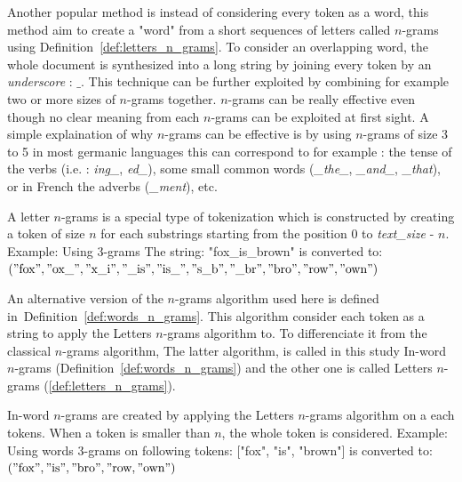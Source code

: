 Another popular method is instead of considering every token as a word, this method aim to create a "word" from a short sequences of letters called $n$-grams using Definition~\ref{def:letters_n_grams}.
To consider an overlapping word, the whole document is synthesized into a long string by joining every token by an \textit{underscore} : $\_$.
This technique can be further exploited by combining for example two or more sizes of $n$-grams together.
$n$-grams can be really effective even though no clear meaning from each $n$-grams can be exploited at first sight.
A simple explaination of why $n$-grams can be effective is by using $n$-grams of size 3 to 5 in most germanic languages this can correspond to for example : the tense of the verbs (i.e. : \textit{ing\_}, \textit{ed\_}), some small common words (\textit{\_the\_}, \textit{\_and\_}, \textit{\_that}), or in French the adverbs (\textit{\_ment}), etc.

\begin{definition}
  \label{def:letters_n_grams}
  A letter $n$-grams is a special type of tokenization which is constructed by creating a token of size $n$ for each substrings starting from the position $0$ to \textit{text\_size} - $n$.
  Example: Using 3-grams The string: "fox\_is\_brown" is converted to: \\
  $("\text{fox}", "\text{ox\_}", "\text{x\_i}", "\text{\_is}", "\text{is\_}", "\text{s\_b}", "\text{\_br}", "\text{bro}", "\text{row}", "\text{own}")$
\end{definition}

An alternative version of the $n$-grams algorithm used here is defined in~Definition~\ref{def:words_n_grams}.
This algorithm consider each token as a string to apply the Letters $n$-grams algorithm to.
To differenciate it from the classical $n$-grams algorithm,
The latter algorithm, is called in this study In-word $n$-grams (Definition~\ref{def:words_n_grams}) and the other one is  called Letters $n$-grams (\ref{def:letters_n_grams}).

\begin{definition}
  \label{def:words_n_grams}
  In-word $n$-grams are created by applying the Letters $n$-grams algorithm on a each tokens.
  When a token is smaller than $n$, the whole token is considered.
  Example: Using words 3-grams on following tokens: ["fox", "is", "brown"] is converted to: \\
  $("\text{fox}", "\text{is}", "\text{bro}", "\text{row}, "\text{own}")$
\end{definition}

